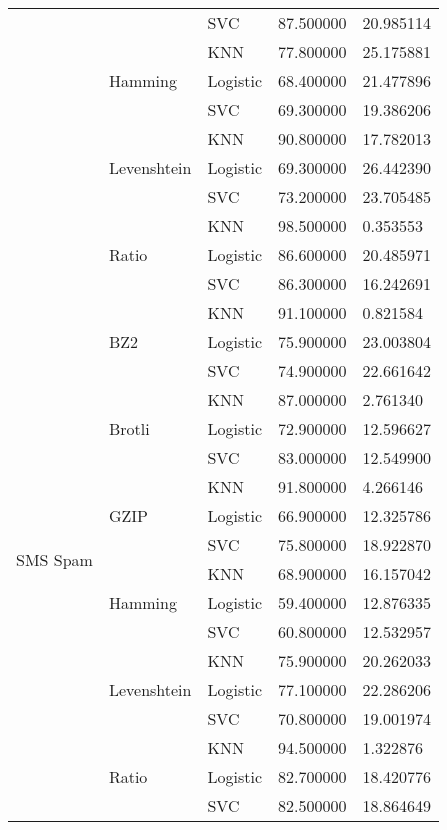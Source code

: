 {\begin{tabular}{lllll}
 &  & SVC & 87.500000 & 20.985114 \\
\cline{2-5}
 & \multirow[t]{3}{*}{Hamming} & KNN & 77.800000 & 25.175881 \\
 &  & Logistic & 68.400000 & 21.477896 \\
 &  & SVC & 69.300000 & 19.386206 \\
\cline{2-5}
 & \multirow[t]{3}{*}{Levenshtein} & KNN & 90.800000 & 17.782013 \\
 &  & Logistic & 69.300000 & 26.442390 \\
 &  & SVC & 73.200000 & 23.705485 \\
\cline{2-5}
 & \multirow[t]{3}{*}{Ratio} & KNN & 98.500000 & 0.353553 \\
 &  & Logistic & 86.600000 & 20.485971 \\
 &  & SVC & 86.300000 & 16.242691 \\
\cline{1-5} \cline{2-5}
\multirow[t]{18}{*}{SMS Spam} & \multirow[t]{3}{*}{BZ2} & KNN & 91.100000 & 0.821584 \\
 &  & Logistic & 75.900000 & 23.003804 \\
 &  & SVC & 74.900000 & 22.661642 \\
\cline{2-5}
 & \multirow[t]{3}{*}{Brotli} & KNN & 87.000000 & 2.761340 \\
 &  & Logistic & 72.900000 & 12.596627 \\
 &  & SVC & 83.000000 & 12.549900 \\
\cline{2-5}
 & \multirow[t]{3}{*}{GZIP} & KNN & 91.800000 & 4.266146 \\
 &  & Logistic & 66.900000 & 12.325786 \\
 &  & SVC & 75.800000 & 18.922870 \\
\cline{2-5}
 & \multirow[t]{3}{*}{Hamming} & KNN & 68.900000 & 16.157042 \\
 &  & Logistic & 59.400000 & 12.876335 \\
 &  & SVC & 60.800000 & 12.532957 \\
\cline{2-5}
 & \multirow[t]{3}{*}{Levenshtein} & KNN & 75.900000 & 20.262033 \\
 &  & Logistic & 77.100000 & 22.286206 \\
 &  & SVC & 70.800000 & 19.001974 \\
\cline{2-5}
 & \multirow[t]{3}{*}{Ratio} & KNN & 94.500000 & 1.322876 \\
 &  & Logistic & 82.700000 & 18.420776 \\
 &  & SVC & 82.500000 & 18.864649 \\
\cline{1-5} \cline{2-5}

\end{tabular}}
